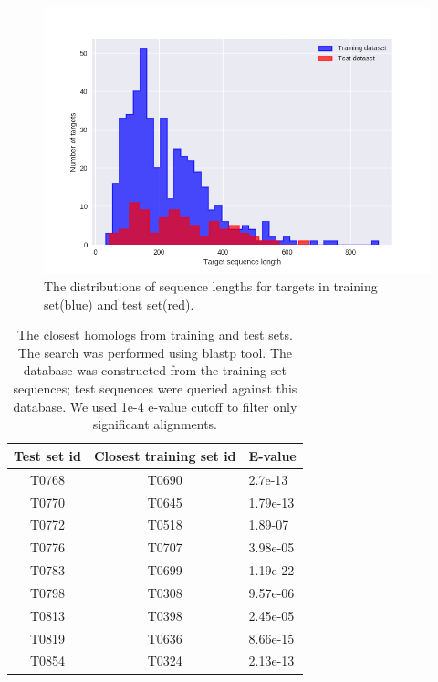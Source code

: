 \documentclass[a4paper,10pt]{article}
\begin{document}
\begin{figure}[H]
    \centering
    \includegraphics[width=\linewidth]{Fig/datasetLengthDistributions.png}
    \caption{The distributions of sequence lengths for targets in training set(blue) and test set(red).}
    \label{Fig:dataLengthDist}
\end{figure}

\begin{table}[H]
\begin{center}
\begin{tabular}{ c | c | l }
    
    Test set id & Closest training set id & E-value \\
    \hline
    T0768 & T0690 & 2.7e-13\\
    T0770 & T0645 & 1.79e-13\\
    T0772 & T0518 & 1.89-07\\
    T0776 & T0707 & 3.98e-05\\
    T0783 & T0699 & 1.19e-22\\
    T0798 & T0308 & 9.57e-06\\
    T0813 & T0398 & 2.45e-05\\
    T0819 & T0636 & 8.66e-15\\
    T0854 & T0324 & 2.13e-13\\
    
\end{tabular}
    
    \caption {The closest homologs from training and test sets. The search was performed using blastp tool. The database was constructed from 
    the training set sequences; test sequences were queried against this database. We used 1e-4 e-value cutoff to filter only significant 
    alignments.}
    \label{Tbl:datasetsSimilarity}
\end{center}
\end{table}
\end{document}
